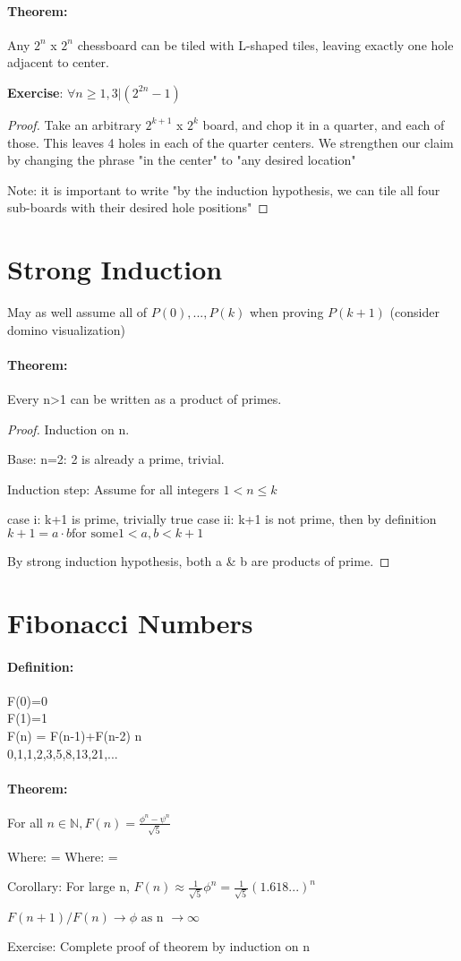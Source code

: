 \documentclass[11pt, notitlepage]{report}
\newcommand{\N}{\mathbb{N}}
\newenvironment{theorem}{\paragraph{Theorem:}}{\hfill}
\newenvironment{definition}{\paragraph{Definition:}}{\hfill}
\begin{document}
\begin{theorem}
	Any $2^n$ x $2^n$ chessboard can be tiled with L-shaped tiles, leaving exactly one hole adjacent to center.
	
	\textbf{Exercise}: $\forall n\geq 1, 3 | (2^{2n} - 1)$ 
	
	\begin{proof}
		Take an arbitrary $2^{k+1} $  x $ 2^{k}$ board, and chop it in a quarter, and each of those. This leaves 4 holes in each of the quarter centers. We strengthen our claim by changing the phrase "in the center" to "any desired location"
		
		Note: it is important to write "by the induction hypothesis, we can tile all four sub-boards with their desired hole positions"
	\end{proof}
\end{theorem}

\section{Strong Induction}

May as well assume all of $P(0),...,P(k)$ when proving $P(k+1)$ (consider domino visualization)

\begin{theorem}
	Every n>1 can be written as a product of primes.
	
	\begin{proof}
		Induction on n.
		
		Base: n=2: 2 is already a prime, trivial.
		
		Induction step: Assume for all integers $1<n\leq k$
		
		case i: k+1 is prime, trivially true
		case ii: k+1 is not prime, then by definition $k+1 = a\cdot b \text{for some} 1< a,b < k+1$
		
		By strong induction hypothesis, both a \& b are products of prime. 
	\end{proof}
\end{theorem}

\section{Fibonacci Numbers}

\begin{definition}
	F(0)=0 \\
	F(1)=1 \\
	F(n) = F(n-1)+F(n-2) \forall n  \\
	0,1,1,2,3,5,8,13,21,...
\end{definition}

\begin{theorem}
	For all $n\in\N, F(n) = \frac{\phi^n-\psi^n}{\sqrt{5}}$
	
	Where: \phi = 
	Where: \psi = 
	
	Corollary: For large n, $F(n) \approx \frac{1}{\sqrt{5}}\phi^n=\frac{1}{\sqrt{5}}(1.618...)^n$
	
	$F(n+1)/F(n) \rightarrow \phi \text{ as n } \rightarrow \infty$
	
	Exercise: Complete proof of theorem by induction on n
	
\end{theorem}
\end{document}
